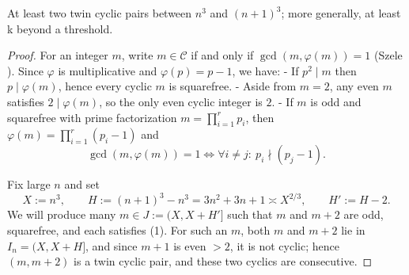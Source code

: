 \begin{theorem}\label{thm:twin_cyclics_between_consecutive_cubes}
At least two twin cyclic pairs between \(n^3\) and \((n+1)^3\); more generally, at least k beyond a threshold.
\end{theorem}

\begin{proof}
For an integer $m$, write $m\in\mathcal C$ if and only if $\gcd(m,\varphi(m))=1$ (Szele \cite{Szele1947}). Since $\varphi$ is multiplicative and $\varphi(p)=p-1$, we have:
- If $p^2\mid m$ then $p\mid\varphi(m)$, hence every cyclic $m$ is squarefree.
- Aside from $m=2$, any even $m$ satisfies $2\mid\varphi(m)$, so the only even cyclic integer is $2$.
- If $m$ is odd and squarefree with prime factorization $m=\prod_{i=1}^r p_i$, then $\varphi(m)=\prod_{i=1}^r (p_i-1)$ and
  $$\gcd(m,\varphi(m))=1\iff \forall i\ne j:\ p_i\nmid (p_j-1).\tag{1}$$

Fix large $n$ and set
$$X:=n^3,\qquad H:=(n+1)^3-n^3=3n^2+3n+1\asymp X^{2/3},\qquad H':=H-2.$$
We will produce many $m\in J:=(X,X+H']$ such that $m$ and $m+2$ are odd, squarefree, and each satisfies (1). For such an $m$, both $m$ and $m+2$ lie in $I_n=(X,X+H]$, and since $m+1$ is even $>2$, it is not cyclic; hence $(m,m+2)$ is a twin cyclic pair, and these two cyclics are consecutive.


\end{proof}
